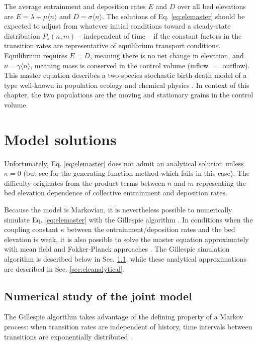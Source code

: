 The average entrainment and deposition rates $E$ and $D$ over all bed elevations are $E = \lambda +\mu \langle n \rangle$ and $D=\sigma \langle n \rangle$.
The solutions of Eq. \ref{eq:elemaster} should be expected to adjust from whatever initial conditions toward a steady-state distribution $P_s(n,m)$ -- independent of time -- if the constant factors in the transition rates are representative of equilibrium transport conditions.
Equilibrium requires $E=D$, meaning there is no net change in elevation, and $\nu = \gamma \langle n \rangle$, meaning mass is conserved in the control volume (inflow $=$ outflow).
This master equation describes a two-species stochastic birth-death model \citep{Cox1965} of a type well-known in population ecology \citep{Pielou1977, Swift2002} and chemical physics \citep{Gardiner1983}.
In context of this chapter, the two populations are the moving and stationary grains in the control volume.

\section{Model solutions}
\label{sec:elesolution}

Unfortunately, Eq. \ref{eq:elemaster} does not admit an analytical solution unless $\kappa=0$ (but see \citet{Swift2002} for the generating function method which fails in this case).
The difficulty originates from the product terms between $n$ and $m$ representing the bed elevation dependence of collective entrainment and deposition rates.

Because the model is Markovian, it is nevertheless possible to numerically simulate Eq. \ref{eq:elemaster} with the Gillespie algorithm \citep{Gillespie1977, Gillespie1991, Gillespie2007}. 
In conditions when the coupling constant $\kappa$ between the entrainment/deposition rates and the bed elevation is weak, it is also possible to solve the master equation approximately with mean field and Fokker-Planck approaches \citep{Haken1978,Gardiner1983}.
The Gillespie simulation algorithm is described below in Sec. \ref{sec:elenumerical}, while these analytical approximations are described in Sec. \ref{sec:eleanalytical}.

\subsection{Numerical study of the joint model}
\label{sec:elenumerical}

The Gillespie algorithm takes advantage of the defining property of a Markov process: when transition rates are independent of history, time intervals between transitions are
exponentially distributed \citep{Cox1965}.

